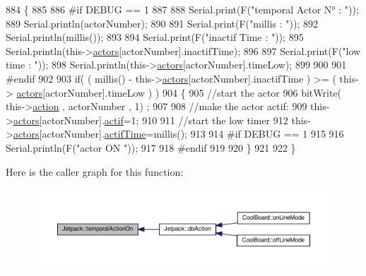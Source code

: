 \begin{DoxyCode}
884 \{
885 
886 \textcolor{preprocessor}{#if DEBUG == 1}
887     
888     Serial.print(F(\textcolor{stringliteral}{"temporal Actor N° : "}));
889     Serial.println(actorNumber);
890 
891     Serial.print(F(\textcolor{stringliteral}{"millis : "}));
892     Serial.println(millis());
893 
894     Serial.print(F(\textcolor{stringliteral}{"inactif Time : "}));
895     Serial.println(this->\hyperlink{class_jetpack_a7e16d2f97837f9712a2e6de1c50d99db}{actors}[actorNumber].inactifTime);
896 
897     Serial.print(F(\textcolor{stringliteral}{"low time : "}));
898     Serial.println(this->\hyperlink{class_jetpack_a7e16d2f97837f9712a2e6de1c50d99db}{actors}[actorNumber].timeLow);
899 
900 
901 \textcolor{preprocessor}{#endif}
902     
903      \textcolor{keywordflow}{if}( ( millis() - this->\hyperlink{class_jetpack_a7e16d2f97837f9712a2e6de1c50d99db}{actors}[actorNumber].inactifTime ) >= (  this->
      \hyperlink{class_jetpack_a7e16d2f97837f9712a2e6de1c50d99db}{actors}[actorNumber].timeLow  ) )
904     \{
905         \textcolor{comment}{//start the actor}
906         bitWrite( this->\hyperlink{class_jetpack_aca3142925a7b0834b34ae91d26af7765}{action} , actorNumber , 1) ;
907 
908         \textcolor{comment}{//make the actor actif:}
909         this->\hyperlink{class_jetpack_a7e16d2f97837f9712a2e6de1c50d99db}{actors}[actorNumber].\hyperlink{struct_jetpack_1_1state_aa177541689bbaea21a4650a083b0df77}{actif}=1;
910 
911         \textcolor{comment}{//start the low timer}
912         this->\hyperlink{class_jetpack_a7e16d2f97837f9712a2e6de1c50d99db}{actors}[actorNumber].\hyperlink{struct_jetpack_1_1state_af2e1cc323ef9ffcc3cf4d203f85d726b}{actifTime}=millis();
913 
914 \textcolor{preprocessor}{    #if DEBUG == 1 }
915 
916         Serial.println(F(\textcolor{stringliteral}{"actor ON "}));
917 
918 \textcolor{preprocessor}{    #endif              }
919 
920     \}
921 
922 \}
\end{DoxyCode}
Here is the caller graph for this function\+:
\nopagebreak
\begin{figure}[H]
\begin{center}
\leavevmode
\includegraphics[width=350pt]{df/d1d/class_jetpack_ad011d904f639accb5f94ef806846ef59_icgraph}
\end{center}
\end{figure}
\mbox{\label{class_jetpack_a338f1af8cbc6504ac69b47c7328569b5}} 
